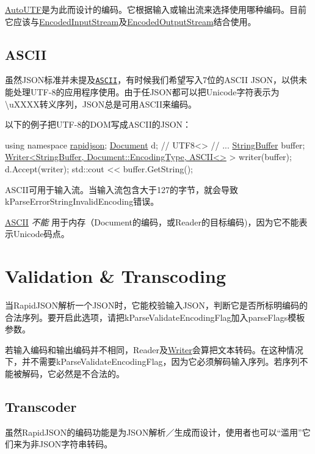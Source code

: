 {\ttfamily \hyperlink{struct_auto_u_t_f}{Auto\+U\+TF}}是为此而设计的编码。它根据输入或输出流来选择使用哪种编码。目前它应该与{\ttfamily \hyperlink{class_encoded_input_stream}{Encoded\+Input\+Stream}}及{\ttfamily \hyperlink{class_encoded_output_stream}{Encoded\+Output\+Stream}}结合使用。\hypertarget{md_Cadriciel_Commun_Externe_RapidJSON_doc_encoding.zh-cn_ASCII}{}\subsection{A\+S\+C\+II}\label{md_Cadriciel_Commun_Externe_RapidJSON_doc_encoding.zh-cn_ASCII}
虽然\+J\+S\+O\+N标准并未提及\href{http://en.wikipedia.org/wiki/ASCII}{\tt A\+S\+C\+II}，有时候我们希望写入7位的\+A\+S\+C\+II J\+S\+O\+N，以供未能处理\+U\+T\+F-\/8的应用程序使用。由于任\+J\+S\+O\+N都可以把\+Unicode字符表示为{\ttfamily \textbackslash{}u\+X\+X\+XX}转义序列，\+J\+S\+O\+N总是可用\+A\+S\+C\+I\+I来编码。

以下的例子把\+U\+T\+F-\/8的\+D\+O\+M写成\+A\+S\+C\+I\+I的\+J\+S\+O\+N：


\begin{DoxyCode}
\textcolor{keyword}{using namespace }\hyperlink{namespacerapidjson}{rapidjson};
\hyperlink{class_generic_document}{Document} d; \textcolor{comment}{// UTF8<>}
\textcolor{comment}{// ...}
\hyperlink{class_generic_string_buffer}{StringBuffer} buffer;
\hyperlink{class_writer}{Writer<StringBuffer, Document::EncodingType, ASCII<>} > 
      writer(buffer);
d.Accept(writer);
std::cout << buffer.GetString();
\end{DoxyCode}


A\+S\+C\+I\+I可用于输入流。当输入流包含大于127的字节，就会导致{\ttfamily k\+Parse\+Error\+String\+Invalid\+Encoding}错误。

\hyperlink{struct_a_s_c_i_i}{A\+S\+C\+II} {\itshape 不能} 用于内存（{\ttfamily Document}的编码，或{\ttfamily Reader}的目标编码)，因为它不能表示\+Unicode码点。\hypertarget{md_Cadriciel_Commun_Externe_RapidJSON_doc_encoding.zh-cn_ValidationTranscoding}{}\section{Validation \& Transcoding}\label{md_Cadriciel_Commun_Externe_RapidJSON_doc_encoding.zh-cn_ValidationTranscoding}
当\+Rapid\+J\+S\+O\+N解析一个\+J\+S\+O\+N时，它能校验输入\+J\+S\+O\+N，判断它是否所标明编码的合法序列。要开启此选项，请把{\ttfamily k\+Parse\+Validate\+Encoding\+Flag}加入{\ttfamily parse\+Flags}模板参数。

若输入编码和输出编码并不相同，{\ttfamily Reader}及{\ttfamily \hyperlink{class_writer}{Writer}}会算把文本转码。在这种情况下，并不需要{\ttfamily k\+Parse\+Validate\+Encoding\+Flag}，因为它必须解码输入序列。若序列不能被解码，它必然是不合法的。\hypertarget{md_Cadriciel_Commun_Externe_RapidJSON_doc_encoding.zh-cn_Transcoder}{}\subsection{Transcoder}\label{md_Cadriciel_Commun_Externe_RapidJSON_doc_encoding.zh-cn_Transcoder}
虽然\+Rapid\+J\+S\+O\+N的编码功能是为\+J\+S\+O\+N解析／生成而设计，使用者也可以“滥用”它们来为非\+J\+S\+O\+N字符串转码。

